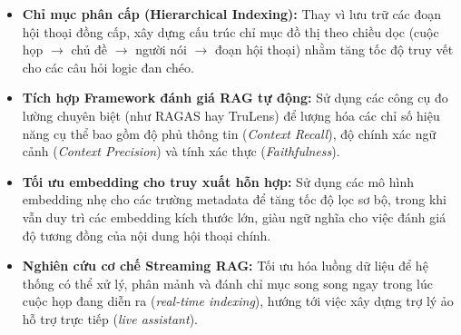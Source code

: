 \begin{itemize}[leftmargin=*, label={}]
    \item \textbf{Chỉ mục phân cấp (Hierarchical Indexing):} 
    Thay vì lưu trữ các đoạn hội thoại đồng cấp, xây dựng cấu trúc chỉ mục đồ thị theo chiều dọc (cuộc họp $\rightarrow$ chủ đề $\rightarrow$ người nói $\rightarrow$ đoạn hội thoại) nhằm tăng tốc độ truy vết cho các câu hỏi logic đan chéo.
    
    \item \textbf{Tích hợp Framework đánh giá RAG tự động:} 
    Sử dụng các công cụ đo lường chuyên biệt (như RAGAS hay TruLens) để lượng hóa các chỉ số hiệu năng cụ thể bao gồm độ phủ thông tin (\textit{Context Recall}), độ chính xác ngữ cảnh (\textit{Context Precision}) và tính xác thực (\textit{Faithfulness}).

    \item \textbf{Tối ưu embedding cho truy xuất hỗn hợp:}
    Sử dụng các mô hình embedding nhẹ cho các trường metadata để tăng tốc độ lọc sơ bộ, trong khi vẫn duy trì các embedding kích thước lớn, giàu ngữ nghĩa cho việc đánh giá độ tương đồng của nội dung hội thoại chính.

    \item \textbf{Nghiên cứu cơ chế Streaming RAG:}
    Tối ưu hóa luồng dữ liệu để hệ thống có thể xử lý, phân mảnh và đánh chỉ mục song song ngay trong lúc cuộc họp đang diễn ra (\textit{real-time indexing}), hướng tới việc xây dựng trợ lý ảo hỗ trợ trực tiếp (\textit{live assistant}).
\end{itemize}